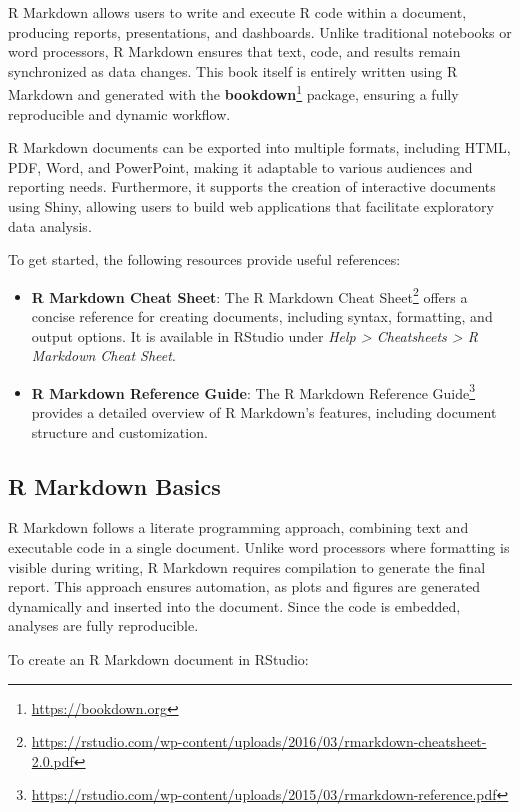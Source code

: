 \documentclass[
  11pt,
]{book}
\providecommand{\tightlist}{%
  \setlength{\itemsep}{0pt}\setlength{\parskip}{0pt}}
\renewcommand{\href}[2]{#2\footnote{\url{#1}}}
\theoremstyle{definition}
\theoremstyle{definition}
\theoremstyle{definition}
\theoremstyle{definition}
\theoremstyle{remark}
\begin{document}
R Markdown allows users to write and execute R code within a document, producing reports, presentations, and dashboards. Unlike traditional notebooks or word processors, R Markdown ensures that text, code, and results remain synchronized as data changes. This book itself is entirely written using R Markdown and generated with the \href{https://bookdown.org}{\textbf{bookdown}} package, ensuring a fully reproducible and dynamic workflow.

R Markdown documents can be exported into multiple formats, including HTML, PDF, Word, and PowerPoint, making it adaptable to various audiences and reporting needs. Furthermore, it supports the creation of interactive documents using Shiny, allowing users to build web applications that facilitate exploratory data analysis.

To get started, the following resources provide useful references:

\begin{itemize}
\tightlist
\item
  \textbf{R Markdown Cheat Sheet}: The \href{https://rstudio.com/wp-content/uploads/2016/03/rmarkdown-cheatsheet-2.0.pdf}{R Markdown Cheat Sheet} offers a concise reference for creating documents, including syntax, formatting, and output options. It is available in RStudio under \emph{Help \textgreater{} Cheatsheets \textgreater{} R Markdown Cheat Sheet}.\\
\item
  \textbf{R Markdown Reference Guide}: The \href{https://rstudio.com/wp-content/uploads/2015/03/rmarkdown-reference.pdf}{R Markdown Reference Guide} provides a detailed overview of R Markdown's features, including document structure and customization.
\end{itemize}

\subsection*{R Markdown Basics}\label{r-markdown-basics}


R Markdown follows a literate programming approach, combining text and executable code in a single document. Unlike word processors where formatting is visible during writing, R Markdown requires compilation to generate the final report. This approach ensures automation, as plots and figures are generated dynamically and inserted into the document. Since the code is embedded, analyses are fully reproducible.

To create an R Markdown document in RStudio:
\end{document}

